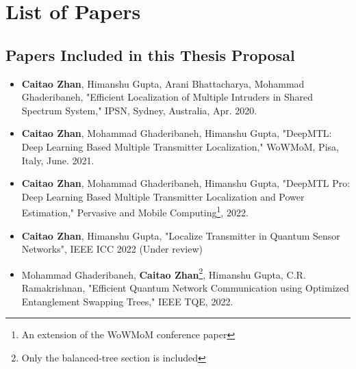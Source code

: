 \chapter{List of Papers}

\section*{Papers Included in this Thesis Proposal}
\begin{itemize}
    \item \textbf{Caitao Zhan}, Himanshu Gupta, Arani Bhattacharya, Mohammad Ghaderibaneh, "Efficient Localization of Multiple Intruders in Shared Spectrum System," IPSN, Sydney, Australia, Apr. 2020.

    \item \textbf{Caitao Zhan}, Mohammad Ghaderibaneh, Himanshu Gupta, "DeepMTL: Deep Learning Based Multiple Transmitter Localization," WoWMoM, Pisa, Italy, June. 2021. 

    \item \textbf{Caitao Zhan}, Mohammad Ghaderibaneh, Himanshu Gupta, "DeepMTL Pro: Deep Learning Based Multiple Transmitter Localization and Power Estimation," Pervasive and Mobile Computing\footnote{An extension of the WoWMoM conference paper}, 2022.

    \item \textbf{Caitao Zhan}, Himanshu Gupta, "Localize Transmitter in Quantum Sensor Networks", IEEE ICC 2022 (Under review)

    \item Mohammad Ghaderibaneh, \textbf{Caitao Zhan}\footnote{Only the balanced-tree section is included}, Himanshu Gupta, C.R. Ramakrishnan, "Efficient Quantum Network Communication using Optimized Entanglement Swapping Trees," IEEE TQE, 2022.


\end{itemize}

